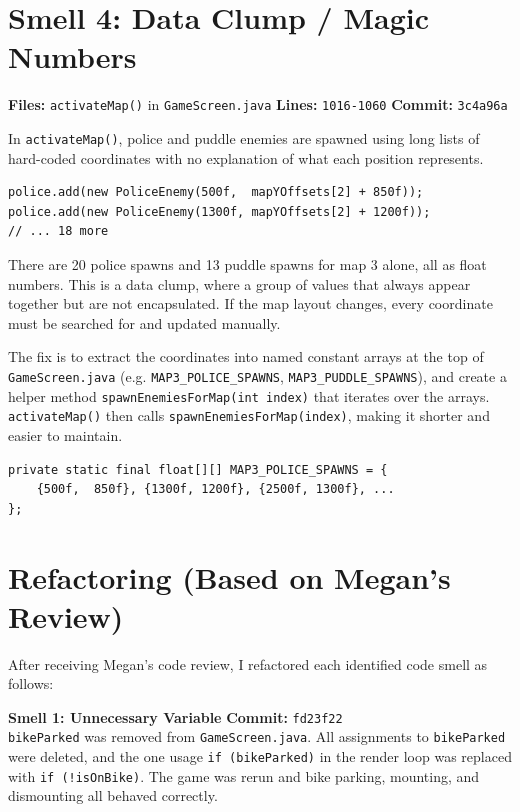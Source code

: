 \documentclass[10pt]{article}
\begin{document}
\section{Smell 4: Data Clump / Magic Numbers}

\textbf{Files:} \texttt{activateMap()} in \texttt{GameScreen.java} \quad
\textbf{Lines:} \texttt{1016-1060} \quad
\textbf{Commit:} \texttt{3c4a96a}

In \texttt{activateMap()}, police and puddle enemies are spawned using long lists 
of hard-coded coordinates with no explanation of what each position represents.

\begin{lstlisting}
police.add(new PoliceEnemy(500f,  mapYOffsets[2] + 850f));
police.add(new PoliceEnemy(1300f, mapYOffsets[2] + 1200f));
// ... 18 more
\end{lstlisting}

There are 20 police spawns and 13 puddle spawns for map 3 alone, all as
float numbers. This is a data clump, where a group of values that always appear together 
but are not encapsulated. If the map layout changes, every coordinate must be 
searched for and updated manually.

The fix is to extract the coordinates into named constant arrays at the top of 
\texttt{GameScreen.java} (e.g. \texttt{MAP3\_POLICE\_SPAWNS}, \texttt{MAP3\_PUDDLE\_SPAWNS}), 
and create a  helper method \texttt{spawnEnemiesForMap(int index)} that 
iterates over the arrays. \texttt{activateMap()} then calls 
\texttt{spawnEnemiesForMap(index)}, making it shorter and easier to maintain.

\begin{lstlisting}
private static final float[][] MAP3_POLICE_SPAWNS = {
    {500f,  850f}, {1300f, 1200f}, {2500f, 1300f}, ...
};
\end{lstlisting}


\section*{Refactoring 
(Based on Megan's Review)}

After receiving Megan's code review, I refactored each identified code smell as follows:

\textbf{Smell 1: Unnecessary Variable} \quad \textbf{Commit:} \texttt{fd23f22} \\
\texttt{bikeParked} was removed from \texttt{GameScreen.java}. All assignments 
to \texttt{bikeParked} were deleted, and the one usage \texttt{if (bikeParked)} 
in the render loop was replaced with \texttt{if (!isOnBike)}. The game was 
rerun and bike parking, mounting, and dismounting all behaved correctly.
\end{document}
